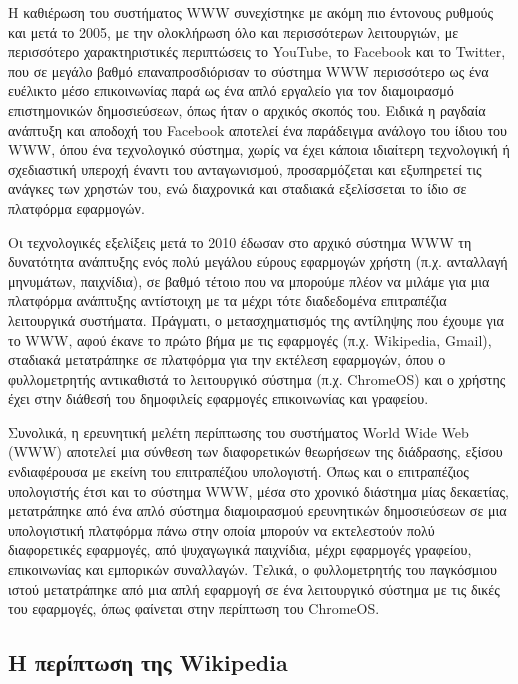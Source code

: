 \documentclass[
]{article}
\begin{document}
Η καθιέρωση του συστήματος WWW συνεχίστηκε με ακόμη πιο έντονους ρυθμούς
και μετά το 2005, με την ολοκλήρωση όλο και περισσότερων λειτουργιών, με
περισσότερο χαρακτηριστικές περιπτώσεις το YouTube, το Facebook και το
Twitter, που σε μεγάλο βαθμό επαναπροσδιόρισαν το σύστημα WWW
περισσότερο ως ένα ευέλικτο μέσο επικοινωνίας παρά ως ένα απλό εργαλείο
για τον διαμοιρασμό επιστημονικών δημοσιεύσεων, όπως ήταν ο αρχικός
σκοπός του. Ειδικά η ραγδαία ανάπτυξη και αποδοχή του Facebook αποτελεί
ένα παράδειγμα ανάλογο του ίδιου του WWW, όπου ένα τεχνολογικό σύστημα,
χωρίς να έχει κάποια ιδιαίτερη τεχνολογική ή σχεδιαστική υπεροχή έναντι
του ανταγωνισμού, προσαρμόζεται και εξυπηρετεί τις ανάγκες των χρηστών
του, ενώ διαχρονικά και σταδιακά εξελίσσεται το ίδιο σε πλατφόρμα
εφαρμογών.

Οι τεχνολογικές εξελίξεις μετά το 2010 έδωσαν στο αρχικό σύστημα WWW τη
δυνατότητα ανάπτυξης ενός πολύ μεγάλου εύρους εφαρμογών χρήστη (π.χ.
ανταλλαγή μηνυμάτων, παιχνίδια), σε βαθμό τέτοιο που να μπορούμε πλέον
να μιλάμε για μια πλατφόρμα ανάπτυξης αντίστοιχη με τα μέχρι τότε
διαδεδομένα επιτραπέζια λειτουργικά συστήματα. Πράγματι, ο
μετασχηματισμός της αντίληψης που έχουμε για το WWW, αφού έκανε το πρώτο
βήμα με τις εφαρμογές (π.χ. Wikipedia, Gmail), σταδιακά μετατράπηκε σε
πλατφόρμα για την εκτέλεση εφαρμογών, όπου ο φυλλομετρητής αντικαθιστά
το λειτουργικό σύστημα (π.χ. ChromeOS) και ο χρήστης έχει στην διάθεσή
του δημοφιλείς εφαρμογές επικοινωνίας και γραφείου.

Συνολικά, η ερευνητική μελέτη περίπτωσης του συστήματος World Wide Web
(WWW) αποτελεί μια σύνθεση των διαφορετικών θεωρήσεων της διάδρασης,
εξίσου ενδιαφέρουσα με εκείνη του επιτραπέζιου υπολογιστή. Όπως και ο
επιτραπέζιος υπολογιστής έτσι και το σύστημα WWW, μέσα στο χρονικό
διάστημα μίας δεκαετίας, μετατράπηκε από ένα απλό σύστημα διαμοιρασμού
ερευνητικών δημοσιεύσεων σε μια υπολογιστική πλατφόρμα πάνω στην οποία
μπορούν να εκτελεστούν πολύ διαφορετικές εφαρμογές, από ψυχαγωγικά
παιχνίδια, μέχρι εφαρμογές γραφείου, επικοινωνίας και εμπορικών
συναλλαγών. Τελικά, ο φυλλομετρητής του παγκόσμιου ιστού μετατράπηκε από
μια απλή εφαρμογή σε ένα λειτουργικό σύστημα με τις δικές του εφαρμογές,
όπως φαίνεται στην περίπτωση του ChromeOS.

\hypertarget{ux3b7-ux3c0ux3b5ux3c1ux3afux3c0ux3c4ux3c9ux3c3ux3b7-ux3c4ux3b7ux3c2-wikipedia}{%
\subsection{Η περίπτωση της
Wikipedia}\label{ux3b7-ux3c0ux3b5ux3c1ux3afux3c0ux3c4ux3c9ux3c3ux3b7-ux3c4ux3b7ux3c2-wikipedia}}
\end{document}

